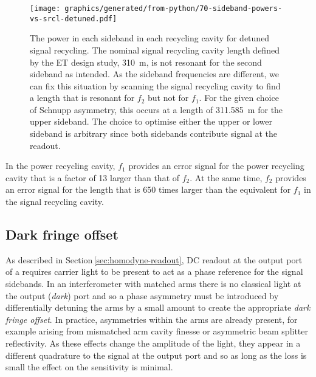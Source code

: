 \begin{figure}
  \centering
  \texttt{[image: graphics/generated/from-python/70-sideband-powers-vs-srcl-detuned.pdf]}
  \caption[Power of the control sidebands in the signal recycling cavity as a function of length of \ETLF{} in the detuned configuration]{\label{fig:sideband-powers-srcl-detuned}The power in each sideband in each recycling cavity for detuned signal recycling. The nominal signal recycling cavity length defined by the \gls{ET} design study, \SI{310}{\meter}, is not resonant for the second sideband as intended. As the sideband frequencies are different, we can fix this situation by scanning the signal recycling cavity to find a length that is resonant for $f_2$ but not for $f_1$. For the given choice of Schnupp asymmetry, this occurs at a length of \SI{311.585}{\meter} for the upper sideband. The choice to optimise either the upper or lower sideband is arbitrary since both sidebands contribute signal at the readout.}
\end{figure}

In the power recycling cavity, $f_1$ provides an error signal for the power recycling cavity that is a factor of \num{13} larger than that of $f_2$. At the same time, $f_2$ provides an error signal for the length that is \num{650} times larger than the equivalent for $f_1$ in the signal recycling cavity.

\subsection{Dark fringe offset}
As described in Section\,\ref{sec:homodyne-readout}, \gls{DC} readout at the output port of a \DRFPMI{} requires carrier light to be present to act as a phase reference for the signal sidebands. In an interferometer with matched arms there is no classical light at the output (\emph{dark}) port and so a phase asymmetry must be introduced by differentially detuning the arms by a small amount to create the appropriate \emph{dark fringe offset}. In practice, asymmetries within the arms are already present, for example arising from mismatched arm cavity finesse or asymmetric beam splitter reflectivity. As these effects change the amplitude of the light, they appear in a different quadrature to the signal at the output port and so as long as the loss is small the effect on the sensitivity is minimal.

